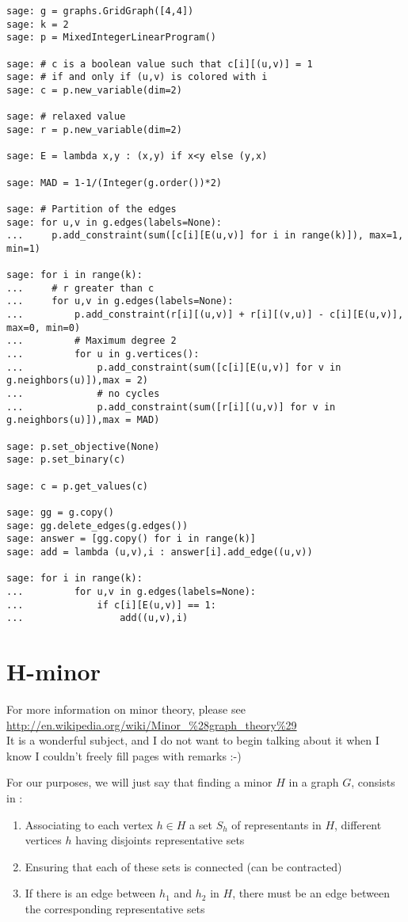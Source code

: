 \begin{lstlisting}
sage: g = graphs.GridGraph([4,4])
sage: k = 2
sage: p = MixedIntegerLinearProgram()

sage: # c is a boolean value such that c[i][(u,v)] = 1
sage: # if and only if (u,v) is colored with i
sage: c = p.new_variable(dim=2)

sage: # relaxed value
sage: r = p.new_variable(dim=2)

sage: E = lambda x,y : (x,y) if x<y else (y,x)

sage: MAD = 1-1/(Integer(g.order())*2)

sage: # Partition of the edges
sage: for u,v in g.edges(labels=None):
...     p.add_constraint(sum([c[i][E(u,v)] for i in range(k)]), max=1, min=1)

sage: for i in range(k):
...     # r greater than c
...     for u,v in g.edges(labels=None):
...         p.add_constraint(r[i][(u,v)] + r[i][(v,u)] - c[i][E(u,v)], max=0, min=0)
...         # Maximum degree 2
...         for u in g.vertices():
...             p.add_constraint(sum([c[i][E(u,v)] for v in g.neighbors(u)]),max = 2)
...             # no cycles
...             p.add_constraint(sum([r[i][(u,v)] for v in g.neighbors(u)]),max = MAD)

sage: p.set_objective(None)
sage: p.set_binary(c)

sage: c = p.get_values(c)

sage: gg = g.copy()
sage: gg.delete_edges(g.edges())
sage: answer = [gg.copy() for i in range(k)]
sage: add = lambda (u,v),i : answer[i].add_edge((u,v))

sage: for i in range(k):
...         for u,v in g.edges(labels=None):
...             if c[i][E(u,v)] == 1:
...                 add((u,v),i)
\end{lstlisting}



\section{H-minor}

For more information on minor theory, please see \\\url{http://en.wikipedia.org/wiki/Minor_\%28graph_theory\%29}\\ It is a wonderful subject, and I do not want to begin talking about it when I know I couldn't freely fill pages with remarks :-)

For our purposes, we will just say that finding a minor $H$ in a graph $G$, consists in :
\begin{enumerate}
\item Associating to each vertex $h\in H$ a set $S_h$ of representants in $H$, different vertices $h$ having disjoints representative sets
\item Ensuring that each of these sets is connected (can be contracted)
\item If there is an edge between $h_1$ and $h_2$ in $H$, there must be an edge between the corresponding representative sets
\end{enumerate}

